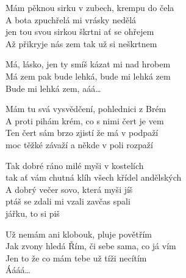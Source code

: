 
\ve{}
Mám pěknou sirku v zubech, krempu do čela\\
A bota zpuchřelá mi vrásky nedělá\\
jen tou svou sirkou škrtni ať se ohřejem\\
Až přikryje nás zem tak už si neškrtnem

\cho{}
Má, lásko, jen ty smíš kázat mi nad hrobem\\
Má zem pak bude lehká, bude mi lehká zem\\
Bude mi lehká zem, aáá\ldots{}

\ve{}
Mám tu svá vysvědčení, pohlednici z Brém\\
A proti pihám krém, co s nimi čert je vem\\
Ten čert sám brzo zjistí že má v podpaží\\
moc těžké závaží a někde v poli rozpaží

\cho{}

\ve{}
Tak dobré ráno milé myši v kostelích\\
tak ať vám chutná klíh všech křídel andělských\\
A dobrý večer sovo, která myši jíš\\
ptáš se zdali mi vzali zavčas spali\\
jářku, to si piš

\cho{}

\ve{}
Už nemám ani klobouk, pluje povětřím\\
Jak zvony hledá Řím, či sebe sama, co já vím\\
Jen to že co mám tebe už tíži necítím\\
Áááá\ldots

\cho{}

\esong{}
